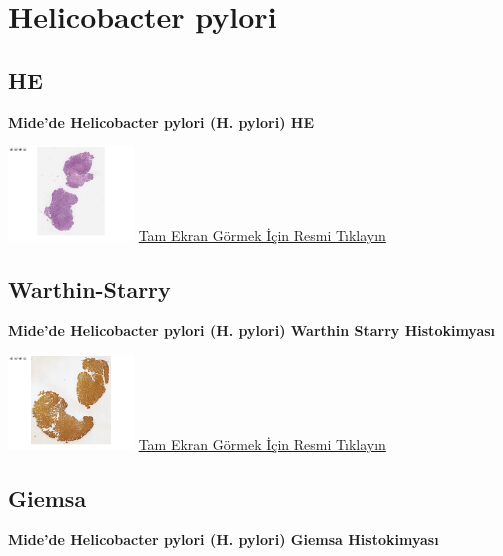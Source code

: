 \documentclass[
  letterpaper,
  DIV=11,
  numbers=noendperiod]{scrreprt}
\begin{document}
\hypertarget{sec-helicobacter-pylori}{%
\section{Helicobacter pylori}\label{sec-helicobacter-pylori}}

\hypertarget{he-4}{%
\subsection{HE}\label{he-4}}

\textbf{Mide'de Helicobacter pylori (H. pylori) HE}

\href{https://images.patolojiatlasi.com/helicobacterpylori/HE.html}{\includegraphics[width=0.25\textwidth,height=\textheight]{./screenshots/helicobacterpylori_screenshot.png}}
\href{https://images.patolojiatlasi.com/helicobacterpylori/HE.html}{Tam
Ekran Görmek İçin Resmi Tıklayın}

\hypertarget{warthin-starry}{%
\subsection{Warthin-Starry}\label{warthin-starry}}

\textbf{Mide'de Helicobacter pylori (H. pylori) Warthin Starry
Histokimyası}

\href{https://images.patolojiatlasi.com/helicobacterpylori/warthinstarry.html}{\includegraphics[width=0.25\textwidth,height=\textheight]{./screenshots/helicobacterpyloriWS_screenshot.png}}
\href{https://images.patolojiatlasi.com/helicobacterpylori/warthinstarry.html}{Tam
Ekran Görmek İçin Resmi Tıklayın}

\hypertarget{giemsa}{%
\subsection{Giemsa}\label{giemsa}}

\textbf{Mide'de Helicobacter pylori (H. pylori) Giemsa Histokimyası}
\end{document}
